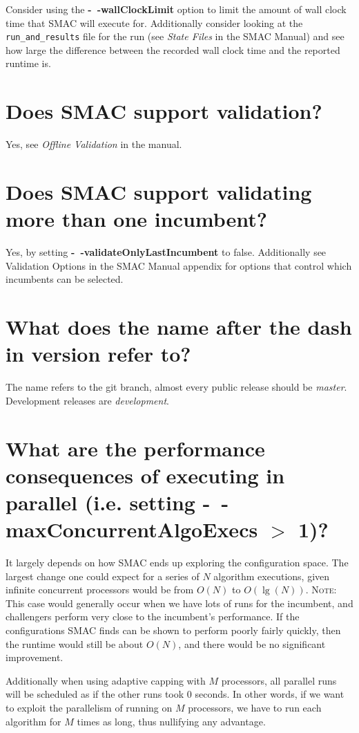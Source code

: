 \documentclass[11pt,letterpaper,oneside]{article}
\begin{document}
	Consider using the \textbf{-~$\!$-wallClockLimit} option to limit the amount of wall clock time that SMAC will execute for. Additionally consider looking at the \texttt{run\_and\_results} file for the run (see \emph{State Files} in the SMAC Manual) and see how large the difference between the recorded wall clock time and the reported runtime is.

\section{Does SMAC support validation?}

	Yes, see \emph{Offline Validation} in the manual.

\section{Does SMAC support validating more than one incumbent?}

	Yes, by setting \textbf{-~$\!$-validateOnlyLastIncumbent} to false. Additionally see {Validation Options} in the SMAC Manual appendix for options that control which incumbents can be selected.
	
\section{What does the name after the dash in version refer to?}
	The name refers to the git branch, almost every public release should be \textit{master}. Development releases are \textit{development}. 

\section{What are the performance consequences of executing in parallel (i.e. setting \textbf{-~$\!$-maxConcurrentAlgoExecs} $>$ 1)?}
	
	It largely depends on how SMAC ends up exploring the configuration space. The largest change one could expect for a series of $N$ algorithm executions, given infinite concurrent processors would be from $O(N)$ to $O(\lg(N))$. \textsc{Note:} This case would generally occur when we have lots of runs for the incumbent, and challengers perform very close to the incumbent's performance. If the configurations SMAC finds can be shown to perform poorly fairly quickly, then the runtime would still be about $O(N)$, and there would be no significant improvement.
	
	Additionally when using adaptive capping with $M$ processors, all parallel runs will be scheduled as if the other runs took 0 seconds. In other words, if we want to exploit the parallelism of running on $M$ processors, we have to run each algorithm for $M$ times as long, thus nullifying any advantage.
	
\end{document}
